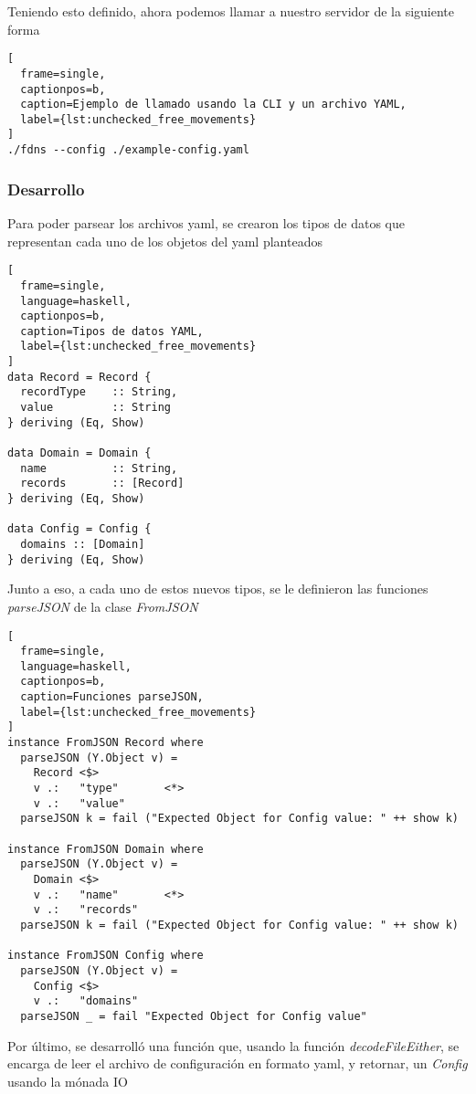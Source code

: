 \documentclass[6pt]{article}
\begin{document}
Teniendo esto definido, ahora podemos llamar a nuestro
servidor de la siguiente forma

\begin{lstlisting}[
  frame=single,
  captionpos=b,
  caption=Ejemplo de llamado usando la CLI y un archivo YAML,
  label={lst:unchecked_free_movements}
]
./fdns --config ./example-config.yaml
\end{lstlisting}

\subsubsection{Desarrollo}

Para poder parsear los archivos yaml, se crearon los tipos de datos
que representan cada uno de los objetos del yaml planteados

\begin{lstlisting}[
  frame=single,
  language=haskell,
  captionpos=b,
  caption=Tipos de datos YAML,
  label={lst:unchecked_free_movements}
]
data Record = Record {
  recordType    :: String,
  value         :: String
} deriving (Eq, Show)

data Domain = Domain {
  name          :: String,
  records       :: [Record]
} deriving (Eq, Show)

data Config = Config {
  domains :: [Domain]
} deriving (Eq, Show)
\end{lstlisting}

Junto a eso, a cada uno de estos nuevos tipos, se le definieron
las funciones \textit{parseJSON} de la clase \textit{FromJSON}

\clearpage
\begin{lstlisting}[
  frame=single,
  language=haskell,
  captionpos=b,
  caption=Funciones parseJSON,
  label={lst:unchecked_free_movements}
]
instance FromJSON Record where
  parseJSON (Y.Object v) =
    Record <$>
    v .:   "type"       <*>
    v .:   "value"
  parseJSON k = fail ("Expected Object for Config value: " ++ show k)

instance FromJSON Domain where
  parseJSON (Y.Object v) =
    Domain <$>
    v .:   "name"       <*>
    v .:   "records"
  parseJSON k = fail ("Expected Object for Config value: " ++ show k)

instance FromJSON Config where
  parseJSON (Y.Object v) =
    Config <$>
    v .:   "domains"
  parseJSON _ = fail "Expected Object for Config value"
\end{lstlisting}

Por último, se desarrolló una función que, usando la función
\textit{decodeFileEither}, se encarga de leer el archivo de configuración
en formato yaml, y retornar, un \textit{Config} usando la mónada IO
\end{document}
